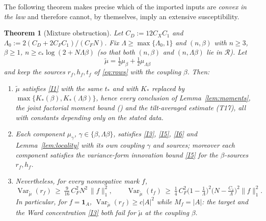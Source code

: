 \documentclass[11pt]{article}
\newtheorem{theorem}{Theorem}[section]
\theoremstyle{definition}
\newcommand{\Var}{\operatorname{Var}}
\begin{document}
The following theorem makes precise which of the imported inputs are \emph{convex in the law} and therefore
cannot, by themselves, imply an extensive susceptibility.

\begin{theorem}[Mixture obstruction]\label{thm:mixture}
Let $C_D:=12C_XC_1$ and $\Lambda_0:=2(C_D+2C_FC_1)/(C_FN)$. Fix $\Lambda\ge\max\{\Lambda_0,1\}$ and
$(n,\beta)$ with $n\ge3$, $\beta\ge1$, $n\ge c_*\log(2+N\Lambda\beta)$ (so that both $(n,\beta)$ and
$(n,\Lambda\beta)$ lie in $\mathcal R$). Let
\[
\tilde\mu=\tfrac12\mu_\beta+\tfrac12\mu_{\Lambda\beta}
\]
and keep the sources $r_f,h_f,t_f$ of \eqref{eq:rows} with the coupling $\beta$. Then:
\begin{enumerate}
\item[(i)] $\tilde\mu$ satisfies \ref{I1} with the same $t_*$ and with $K_*$ replaced by
$\max\{K_*(\beta),K_*(\Lambda\beta)\}$, hence every conclusion of Lemma~\ref{lem:moments}, the joint factorial
moment bound (\cite[lemma on joint factorial moments]{inn}) and the tilt-averaged estimate (T17), all with constants depending only on
the stated data.
\item[(ii)] Each component $\mu_\gamma$, $\gamma\in\{\beta,\Lambda\beta\}$, satisfies \ref{I3}, \ref{I5},
\ref{I6} and Lemma~\ref{lem:locality} with its own coupling $\gamma$ and sources; moreover each component satisfies
the variance-form innovation bound \ref{I5} for the $\beta$-sources $r_f,h_f$.
\item[(iii)] Nevertheless, for every nonnegative mark $f$,
\[
\Var_{\tilde\mu}(r_f)\ \ge\ \tfrac{9}{16}\,C_F^2N^2\,\|f\|_1^2,\qquad
\Var_{\tilde\mu}(t_f)\ \ge\ \tfrac14\,C_F^2\big(1-\tfrac1\Lambda\big)^2\big(N-\tfrac{C_1}{\Lambda}\big)^2\|f\|_1^2 .
\]
In particular, for $f=\mathbf 1_A$, $\Var_{\tilde\mu}(r_f)\ge c|A|^2$ while $M_f=|A|$: the target and the Ward
concentration \ref{I3} both fail for $\tilde\mu$ at the coupling $\beta$.
\end{enumerate}
\end{theorem}
\end{document}
